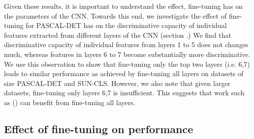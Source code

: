 Given these results, it is important to understand the effect, fine-tuning has on the parameters of the CNN. Towards this end, we investigate the effect of fine-tuning for PASCAL-DET has on the discriminative capacity of individual features extracted from different layers of the CNN (section .) We find that discriminative capacity of individual features from layers 1 to 5 does not changes much, whereas features in layers 6 to 7 become substantially more discriminative. We use this observation to show that fine-tuning only the top two layers (i.e. 6,7) leads to similar performance as achieved by fine-tuning all layers on datasets of size PASCAL-DET and SUN-CLS. However, we also note that given larger datasets, fine-tuning only layers 6,7 is insufficient. This suggests that work such as () can benefit from fine-tuning all layers.        

\subsection{Effect of fine-tuning on performance}
\label{sub:effect-finetune}
\setlength{\tabcolsep}{2pt}
\begin{table}[t!]
\begin{center}
\caption{Comparing the performance of a CNN trained from scratch, pre-trained on Imagenet and fine-tuned for the particular task. VOC 2007 + 2012 data was used for training from scratch and fine-tuning for PASCAL-DET-2. }
\label{table:fine-effect}
\end{center}
\end{table}
\setlength{\tabcolsep}{1.4pt}


